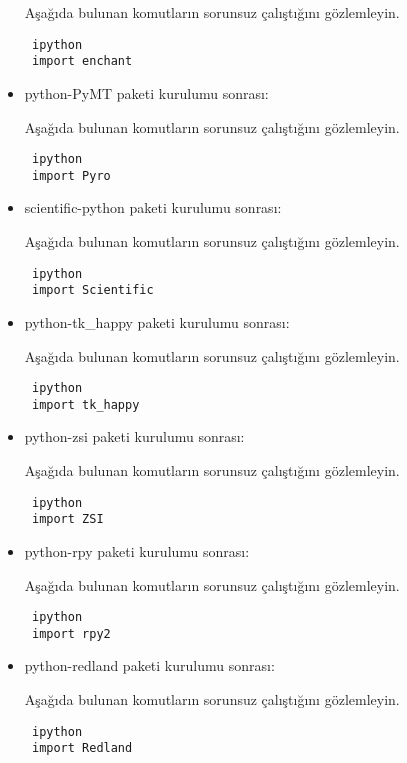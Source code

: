 \documentclass[a4paper,10pt]{article}
\begin{document}
\begin{itemize}
Aşağıda bulunan komutların sorunsuz çalıştığını gözlemleyin.

\begin{verbatim}
 ipython
 import enchant
\end{verbatim}


\item python-PyMT paketi kurulumu sonrası:

Aşağıda bulunan komutların sorunsuz çalıştığını gözlemleyin.

\begin{verbatim}
 ipython
 import Pyro
\end{verbatim}

\item  scientific-python paketi kurulumu sonrası:

Aşağıda bulunan komutların sorunsuz çalıştığını gözlemleyin.

\begin{verbatim}
 ipython
 import Scientific
\end{verbatim}

\item python-tk\_happy paketi kurulumu sonrası:

Aşağıda bulunan komutların sorunsuz çalıştığını gözlemleyin.

\begin{verbatim}
 ipython
 import tk_happy
\end{verbatim}

\item python-zsi paketi kurulumu sonrası:

Aşağıda bulunan komutların sorunsuz çalıştığını gözlemleyin.

\begin{verbatim}
 ipython
 import ZSI
\end{verbatim}


\item python-rpy paketi kurulumu sonrası:

Aşağıda bulunan komutların sorunsuz çalıştığını gözlemleyin.

\begin{verbatim}
 ipython
 import rpy2
\end{verbatim}

\item python-redland paketi kurulumu sonrası:

Aşağıda bulunan komutların sorunsuz çalıştığını gözlemleyin.

\begin{verbatim}
 ipython
 import Redland
\end{verbatim}


\end{itemize}
\end{document}
